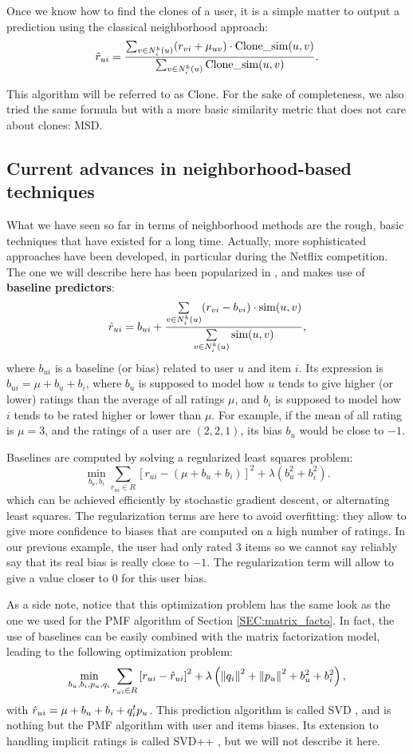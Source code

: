 \noindent
Once we know how to find the clones of a user, it is a simple matter to output
a prediction using the classical neighborhood approach:
$$\hat{r}_{ui} = \frac{\sum_{v \in N_i^k(u)} (r_{vi} + \mu_{uv}) \cdot \text{Clone\_sim}(u,
v)}{\sum_{v \in N_i^k(u)} \text{Clone\_sim}(u, v)}.$$

This algorithm will be referred to as Clone. For the sake of completeness, we
also tried the same formula but with a more basic similarity metric that does
not care about clones: MSD.

\subsection{Current advances in neighborhood-based techniques}
\label{SEC:current_advances_neighborhood_techniques}

What we have seen so far in terms of neighborhood methods are the rough, basic
techniques that have existed for a long time. Actually, more sophisticated
approaches have been developed, in particular during the Netflix competition.
The one we will describe here has been popularized in \cite{BelKorSIGKDD2007},
and makes use of \textbf{baseline predictors}:
$$\hat{r}_{ui} = b_{ui} + \frac{\sum\limits_{v \in N_i^k(u)} (r_{vi} - b_{vi})
\cdot \text{sim}(u, v)} {\sum\limits_{v \in N_i^k(u)}\text{sim}(u, v)},$$
where $b_{ui}$ is a baseline (or bias) related to user $u$ and item $i$. Its
expression is $b_{ui} = \mu + b_u + b_i$, where $b_u$ is supposed to model how
$u$ tends to give higher (or lower) ratings than the average of all ratings
$\mu$, and $b_i$ is supposed to model how $i$ tends to be rated higher or lower
than $\mu$. For example, if the mean of all rating is $\mu = 3$, and the
ratings of a user are $(2, 2, 1)$, its bias $b_u$ would be close to $-1$.

Baselines are computed by solving a regularized least squares problem:
$$\min_{b_u, b_i} \sum_{r_{ui} \in R} \left[r_{ui} - (\mu + b_u + b_i)\right]^2
+ \lambda \left(b_u^2 + b_i^2 \right).$$
which can be achieved efficiently by stochastic gradient descent, or
alternating least squares. The regularization terms are here to avoid
overfitting: they allow to give more confidence to biases that are computed on
a high number of ratings. In our previous example, the user had only rated $3$
items so we cannot say reliably say that its real bias is really close to $-1$.
The regularization term will allow to give a value closer to 0 for this user
bias.

As a side note, notice that this optimization problem has the same look as the
one we used for the PMF algorithm of Section \ref{SEC:matrix_facto}. In fact, the use of
baselines can be easily combined with the matrix factorization model, leading
to the following optimization problem:
$$\min_{b_u, b_i, p_u, q_i} \sum_{r_{ui} \in R} \left[r_{ui} - \hat{r}_{ui}\right]^2
+ \lambda \left({\left\lVert q_i\right\rVert}_{}^2 + {\left\lVert p_u\right\rVert}_{}^2 + b_u^2 + b_i^2 \right),$$
with $\hat{r}_{ui} = \mu + b_u + b_i + q_i^tp_u$. This prediction algorithm is
called SVD \cite{KorBel11}, and is nothing but the PMF algorithm with user and
items biases. Its extension to handling implicit ratings is called SVD++
\cite{KorBel11}, but we will not describe it here.

